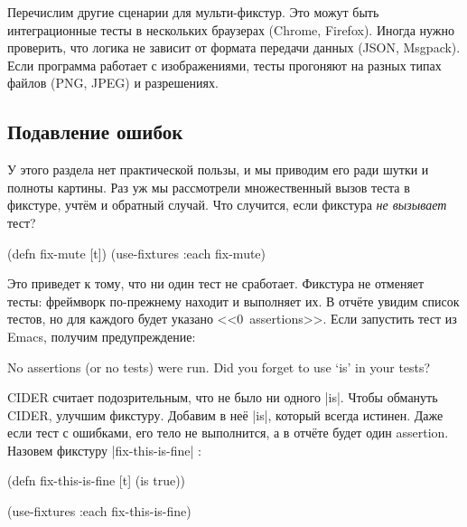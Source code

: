 Перечислим другие сценарии для мульти-фикстур. Это можут быть интеграционные
тесты в нескольких браузерах (Chrome, Firefox). Иногда нужно проверить, что
логика не зависит от формата передачи данных (JSON, Msgpack). Если программа
работает с изображениями, тесты прогоняют на разных типах файлов (PNG, JPEG) и
разрешениях.

\subsection{Подавление ошибок}

У этого раздела нет практической пользы, и мы приводим его ради шутки и полноты
картины. Раз уж мы рассмотрели множественный вызов теста в фикстуре, учтём и
обратный случай. Что случится, если фикстура \emph{не вызывает} тест?


\begin{english}
  \begin{clojure}
(defn fix-mute [t])
(use-fixtures :each fix-mute)
  \end{clojure}
\end{english}

Это приведет к тому, что ни один тест не сработает. Фикстура не отменяет тесты:
фреймворк по-прежнему находит и выполняет их. В отчёте увидим список тестов,
но для каждого будет указано <<0~assertions>>. Если запустить тест из Emacs,
получим предупреждение:

\begin{english}
  \begin{clojure}
No assertions (or no tests) were run.
Did you forget to use ‘is’ in your tests?
  \end{clojure}
\end{english}


CIDER считает подозрительным, что не было ни одного \spverb|is|. Чтобы обмануть
CIDER, улучшим фикстуру. Добавим в неё \spverb|is|, который всегда истинен. Даже
если тест с ошибками, его тело не выполнится, а в отчёте будет один
assertion. Назовем фикстуру \spverb|fix-this-is-fine|%
:

\begin{english}
  \begin{clojure}
(defn fix-this-is-fine [t]
  (is true))

(use-fixtures :each fix-this-is-fine)
  \end{clojure}
\end{english}

